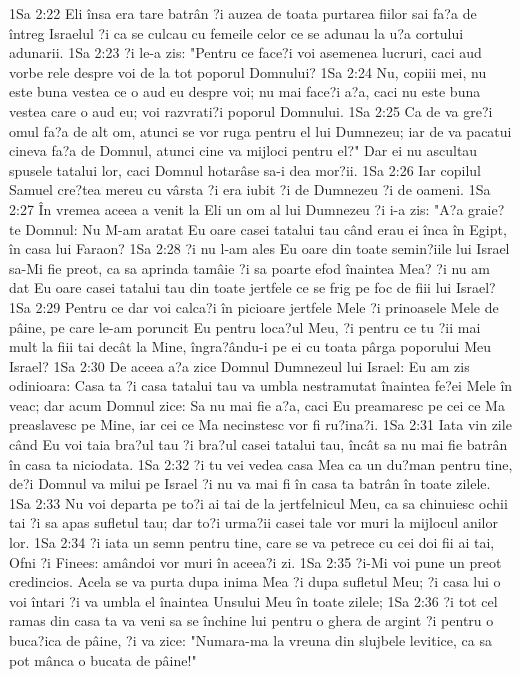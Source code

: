 1Sa 2:22  Eli însa era tare batrân ?i auzea de toata purtarea fiilor sai fa?a de întreg Israelul ?i ca se culcau cu femeile celor ce se adunau la u?a cortului adunarii.
1Sa 2:23  ?i le-a zis: "Pentru ce face?i voi asemenea lucruri, caci aud vorbe rele despre voi de la tot poporul Domnului?
1Sa 2:24  Nu, copiii mei, nu este buna vestea ce o aud eu despre voi; nu mai face?i a?a, caci nu este buna vestea care o aud eu; voi razvrati?i poporul Domnului.
1Sa 2:25  Ca de va gre?i omul fa?a de alt om, atunci se vor ruga pentru el lui Dumnezeu; iar de va pacatui cineva fa?a de Domnul, atunci cine va mijloci pentru el?" Dar ei nu ascultau spusele tatalui lor, caci Domnul hotarâse sa-i dea mor?ii.
1Sa 2:26  Iar copilul Samuel cre?tea mereu cu vârsta ?i era iubit ?i de Dumnezeu ?i de oameni.
1Sa 2:27  În vremea aceea a venit la Eli un om al lui Dumnezeu ?i i-a zis: "A?a graie?te Domnul: Nu M-am aratat Eu oare casei tatalui tau când erau ei înca în Egipt, în casa lui Faraon?
1Sa 2:28  ?i nu l-am ales Eu oare din toate semin?iile lui Israel sa-Mi fie preot, ca sa aprinda tamâie ?i sa poarte efod înaintea Mea? ?i nu am dat Eu oare casei tatalui tau din toate jertfele ce se frig pe foc de fiii lui Israel?
1Sa 2:29  Pentru ce dar voi calca?i în picioare jertfele Mele ?i prinoasele Mele de pâine, pe care le-am poruncit Eu pentru loca?ul Meu, ?i pentru ce tu ?ii mai mult la fiii tai decât la Mine, îngra?ându-i pe ei cu toata pârga poporului Meu Israel?
1Sa 2:30  De aceea a?a zice Domnul Dumnezeul lui Israel: Eu am zis odinioara: Casa ta ?i casa tatalui tau va umbla nestramutat înaintea fe?ei Mele în veac; dar acum Domnul zice: Sa nu mai fie a?a, caci Eu preamaresc pe cei ce Ma preaslavesc pe Mine, iar cei ce Ma necinstesc vor fi ru?ina?i.
1Sa 2:31  Iata vin zile când Eu voi taia bra?ul tau ?i bra?ul casei tatalui tau, încât sa nu mai fie batrân în casa ta niciodata.
1Sa 2:32  ?i tu vei vedea casa Mea ca un du?man pentru tine, de?i Domnul va milui pe Israel ?i nu va mai fi în casa ta batrân în toate zilele.
1Sa 2:33  Nu voi departa pe to?i ai tai de la jertfelnicul Meu, ca sa chinuiesc ochii tai ?i sa apas sufletul tau; dar to?i urma?ii casei tale vor muri la mijlocul anilor lor.
1Sa 2:34  ?i iata un semn pentru tine, care se va petrece cu cei doi fii ai tai, Ofni ?i Finees: amândoi vor muri în aceea?i zi.
1Sa 2:35  ?i-Mi voi pune un preot credincios. Acela se va purta dupa inima Mea ?i dupa sufletul Meu; ?i casa lui o voi întari ?i va umbla el înaintea Unsului Meu în toate zilele;
1Sa 2:36  ?i tot cel ramas din casa ta va veni sa se închine lui pentru o ghera de argint ?i pentru o buca?ica de pâine, ?i va zice: "Numara-ma la vreuna din slujbele levitice, ca sa pot mânca o bucata de pâine!"
